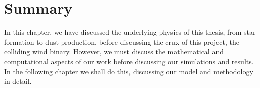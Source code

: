 \section{Summary}

In this chapter, we have discussed the underlying physics of this thesis, from star formation to dust production, before discussing the crux of this project, the colliding wind binary.
However, we must discuss the mathematical and computational aspects of our work before discussing our simulations and results.
In the following chapter we shall do this, discussing our model and methodology in detail.